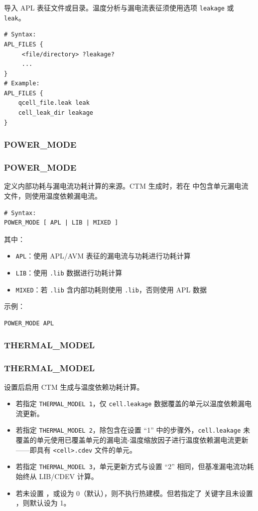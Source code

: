 导入 APL 表征文件或目录。温度分析与漏电流表征须使用选项 \texttt{leakage} 或 \texttt{leak}。
\begin{lstlisting}
# Syntax:
APL_FILES {
     <file/directory> ?leakage?
     ...
}
# Example:
APL_FILES {
    qcell_file.leak leak
    cell_leak_dir leakage
}
\end{lstlisting}

\subsubsection{POWER\_MODE}
\subsubsection*{POWER\_MODE}

定义内部功耗与漏电流功耗计算的来源。CTM 生成时，若在  中包含单元漏电流文件，则使用温度依赖漏电流。
\begin{lstlisting}
# Syntax:
POWER_MODE [ APL | LIB | MIXED ]
\end{lstlisting}
其中：
\begin{itemize}
  \item \texttt{APL}：使用 APL/AVM 表征的漏电流与功耗进行功耗计算
  \item \texttt{LIB}：使用 \texttt{.lib} 数据进行功耗计算
  \item \texttt{MIXED}：若 \texttt{.lib} 含内部功耗则使用 \texttt{.lib}，否则使用 APL 数据
\end{itemize}

示例：
\begin{lstlisting}
POWER_MODE APL
\end{lstlisting}

\subsubsection{THERMAL\_MODEL}
\subsubsection*{THERMAL\_MODEL}

设置后启用 CTM 生成与温度依赖功耗计算。
\begin{itemize}
  \item 若指定 \texttt{THERMAL\_MODEL 1}，仅 \texttt{cell.leakage} 数据覆盖的单元以温度依赖漏电流更新。
  \item 若指定 \texttt{THERMAL\_MODEL 2}，除包含在设置 ``1'' 中的步骤外，\texttt{cell.leakage} 未覆盖的单元使用已覆盖单元的漏电流-温度缩放因子进行温度依赖漏电流更新——即具有 \texttt{<cell>.cdev} 文件的单元。
  \item 若指定 \texttt{THERMAL\_MODEL 3}，单元更新方式与设置 ``2'' 相同，但基准漏电流功耗始终从 LIB/CDEV 计算。
  \item 若未设置 ，或设为 0（默认），则不执行热建模。但若指定了  关键字且未设置 ，则默认设为 1。
\end{itemize}

